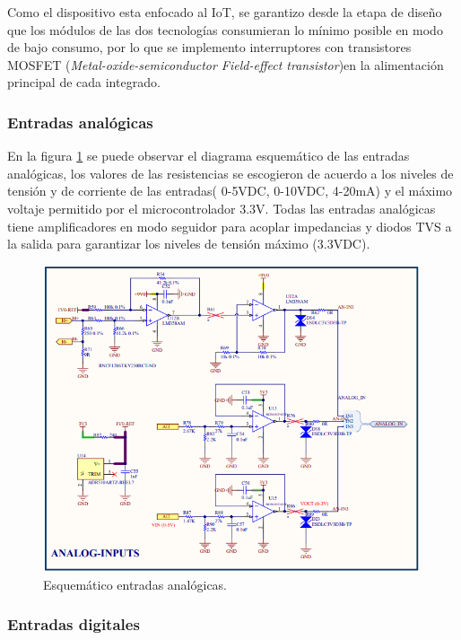 Como el dispositivo esta enfocado al IoT, se garantizo desde la etapa de diseño que los módulos de las dos tecnologías consumieran lo mínimo posible en modo de bajo consumo, por lo que se implemento interruptores con transistores MOSFET (\textit{Metal-oxide-semiconductor Field-effect transistor})en la alimentación principal de cada integrado.

\subsubsection{Entradas analógicas}

En la figura \ref{fig:inputanalog} se puede observar el diagrama esquemático de las entradas analógicas, los valores de las resistencias se escogieron de acuerdo a los niveles de tensión y de corriente de las entradas( 0-5VDC, 0-10VDC, 4-20mA) y el máximo voltaje permitido por el microcontrolador 3.3V. Todas las entradas analógicas tiene amplificadores en modo seguidor para acoplar impedancias y diodos TVS a la salida para garantizar los niveles de tensión máximo (3.3VDC).

\begin{figure}[h]
	\centering
	\includegraphics[scale=.65]{./Figures/inputanalog.PNG}
	\caption{Esquemático entradas analógicas.}
	\label{fig:inputanalog}
\end{figure}

\subsubsection{Entradas digitales}

